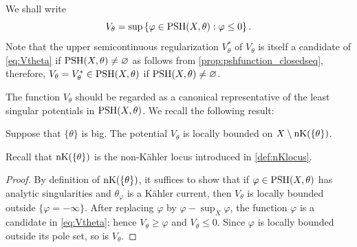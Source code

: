 We shall write
\begin{equation}\label{eq:Vtheta}
    V_{\theta}=\sup\left\{ \varphi\in \mathrm{PSH}(X,\theta):\varphi\leq 0 \right\}.
\end{equation}
Note that the upper semicontinuous regularization $V_{\theta}^*$ of $V_{\theta}$ is itself a candidate of \eqref{eq:Vtheta} if $\mathrm{PSH}(X,\theta)\neq \varnothing$ as follows from \cref{prop:pshfunction_closedseq}, therefore, $V_{\theta}=V_{\theta}^*\in \mathrm{PSH}(X,\theta)$ if $\mathrm{PSH}(X,\theta)\neq \varnothing$.



The function $V_{\theta}$ should be regarded as a canonical representative of the least singular potentials in $\mathrm{PSH}(X,\theta)$. We recall the following result:

\begin{lemma}\label{lma:Vthetalocbdd}
    Suppose that $\{\theta\}$ is big.
    The potential $V_{\theta}$ is locally bounded on $X\setminus \operatorname{nK}(\{\theta\})$.
\end{lemma}
Recall that $\operatorname{nK}(\{\theta\})$ is the non-Kähler locus introduced in \cref{def:nKlocus}.
\begin{proof}
    By definition of $\operatorname{nK}(\{\theta\})$, it suffices to show that if $\varphi\in \mathrm{PSH}(X,\theta)$ has analytic singularities and $\theta_{\varphi}$ is a Kähler current, then $V_{\theta}$ is locally bounded outside $\{\varphi=-\infty\}$. After replacing $\varphi$ by $\varphi-\sup_X\varphi$, the function $\varphi$ is a candidate in \eqref{eq:Vtheta}; hence $V_{\theta}\geq \varphi$ and $V_{\theta}\leq 0$. Since $\varphi$ is locally bounded outside its pole set, so is $V_{\theta}$.
\end{proof}


